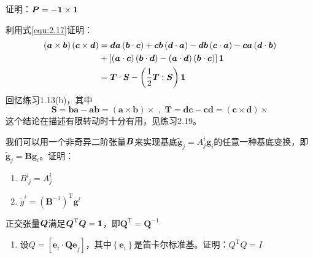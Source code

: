 \begin{exercise}
\begin{enumerate}
        证明：$\bb{P}=-\bf{1}\times \bf{1}$
    \end{enumerate}
    \item  利用式\eqref{equ:2.17}证明：
    \begin{equation}\label{equ:2.38}
        \begin{aligned}
            \left( \boldsymbol{a}\times \boldsymbol{b} \right) \left( \boldsymbol{c}\times \boldsymbol{d} \right) &=\boldsymbol{da}\left( \boldsymbol{b}\cdot \boldsymbol{c} \right) +\boldsymbol{cb}\left( \boldsymbol{d}\cdot \boldsymbol{a} \right) -\boldsymbol{db}\left( \boldsymbol{c}\cdot \boldsymbol{a} \right) -\boldsymbol{ca}\left( \boldsymbol{d}\cdot \boldsymbol{b} \right)\\
            &+\left[ \left( \boldsymbol{a}\cdot \boldsymbol{c} \right) \left( \boldsymbol{b}\cdot \boldsymbol{d} \right) -\left( \boldsymbol{a}\cdot \boldsymbol{d} \right) \left( \boldsymbol{b}\cdot \boldsymbol{c} \right) \right] \bf{1}\\
            &=\boldsymbol{T}\cdot \boldsymbol{S}-\left( \frac{1}{2}\boldsymbol{T}:\boldsymbol{S} \right) \bf{1}
        \end{aligned}
    \end{equation}
    回忆练习1.13(b)，其中
    \begin{equation*}
        \boldsymbol{S}=\boldsymbol{ba}-\boldsymbol{ab}=\left( \boldsymbol{a}\times \boldsymbol{b} \right) \times \,\, , \,\, \boldsymbol{T}=\boldsymbol{dc}-\boldsymbol{cd}=\left( \boldsymbol{c}\times \boldsymbol{d} \right) \times 
    \end{equation*}
    这个结论在描述有限转动时十分有用，见练习2.19。
    \item 我们可以用一个非奇异二阶张量$\bb{B}$来实现基底$\tilde{\boldsymbol{g}}_j=A_{j}^{i}\boldsymbol{g}_i$的任意一种基底变换，即$\tilde{\boldsymbol{g}}_j=\boldsymbol{Bg}_i$。证明：
    \begin{enumerate}
        \item $B_{\cdot j}^{i}=A_{j}^{i}$
        \item $\tilde{g}^i=\left( \boldsymbol{B}^{-1} \right) ^{\mathrm{T}}\boldsymbol{g}^i$
    \end{enumerate}
    \item 正交张量$\bb{Q}$满足$\bb{Q}^{\mathrm{T}}\bb{Q}=\bf{1}$，即$\boldsymbol{Q}^{\mathrm{T}}=\boldsymbol{Q}^{-1}$
    \begin{enumerate}
        \item 设$Q=\left[ \boldsymbol{e}_i\cdot \boldsymbol{Qe}_j \right] $，其中$\left\{ \boldsymbol{e}_i \right\} $是笛卡尔标准基。证明：$Q^{\mathrm{T}}Q=I$

\end{enumerate}
\end{exercise}
